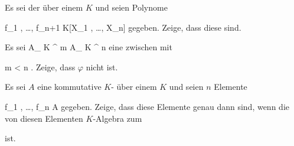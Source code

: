{}
{





Es sei
 der
über einem
$K$ und seien
 Polynome

\mavergleichskette
{\vergleichskette
{ f_1 , \ldots , f_{n+1}
}
{ \in }{ K[X_1 , \ldots , X_n]
}
{  }{
}
{    }{
}
{   }{
}
}
{}{}{}
gegeben. Zeige, dass diese
sind.





}
{} {}

{}
{





Es sei
\maabbdisp {\varphi} { { {\mathbb A}_{  K }^{  m   } } } { { {\mathbb A}_{  K }^{  n   } }
} {}
eine
zwischen
mit

\mavergleichskette
{\vergleichskette
{m
}
{ < }{ n
}
{  }{
}
{    }{
}
{   }{
}
}
{}{}{.}
Zeige, dass $\varphi$ nicht
ist.





}
{} {}

{}
{





Es sei $A$ eine kommutative
$K$-
über einem
$K$ und seien $n$ Elemente

\mavergleichskette
{\vergleichskette
{ f_1 , \ldots ,  f_{n}
}
{ \in }{ A
}
{  }{
}
{    }{
}
{   }{
}
}
{}{}{}
gegeben. Zeige, dass diese Elemente genau dann
sind, wenn die von diesen Elementen
$K$-Algebra
zum

 ist.





}
{} {}






